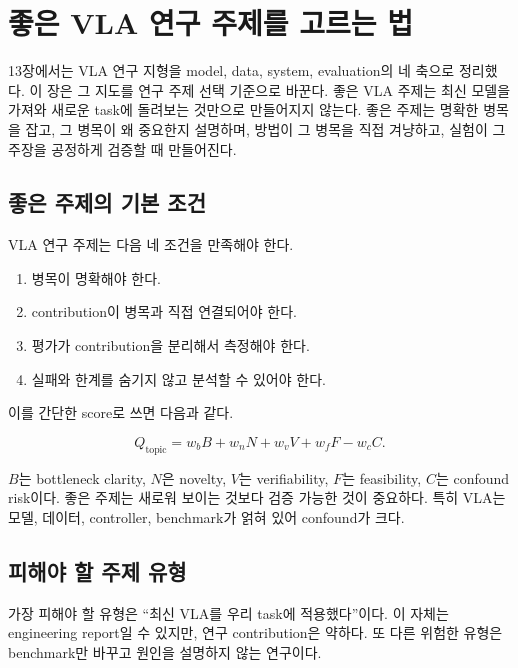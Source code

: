 \chapter{좋은 VLA 연구 주제를 고르는 법}
\label{ch:research_topic_selection}

13장에서는 VLA 연구 지형을 model, data, system, evaluation의 네 축으로 정리했다. 이 장은 그 지도를 연구 주제 선택 기준으로 바꾼다. 좋은 VLA 주제는 최신 모델을 가져와 새로운 task에 돌려보는 것만으로 만들어지지 않는다. 좋은 주제는 명확한 병목을 잡고, 그 병목이 왜 중요한지 설명하며, 방법이 그 병목을 직접 겨냥하고, 실험이 그 주장을 공정하게 검증할 때 만들어진다.

\section{좋은 주제의 기본 조건}

VLA 연구 주제는 다음 네 조건을 만족해야 한다.

\begin{enumerate}
  \item 병목이 명확해야 한다.
  \item contribution이 병목과 직접 연결되어야 한다.
  \item 평가가 contribution을 분리해서 측정해야 한다.
  \item 실패와 한계를 숨기지 않고 분석할 수 있어야 한다.
\end{enumerate}

이를 간단한 score로 쓰면 다음과 같다.

\begin{equation}
  Q_{\mathrm{topic}}
  =
  w_b B
  +
  w_n N
  +
  w_v V
  +
  w_f F
  -
  w_c C.
\end{equation}

$B$는 bottleneck clarity, $N$은 novelty, $V$는 verifiability, $F$는 feasibility, $C$는 confound risk이다. 좋은 주제는 새로워 보이는 것보다 검증 가능한 것이 중요하다. 특히 VLA는 모델, 데이터, controller, benchmark가 얽혀 있어 confound가 크다.

\section{피해야 할 주제 유형}

가장 피해야 할 유형은 ``최신 VLA를 우리 task에 적용했다''이다. 이 자체는 engineering report일 수 있지만, 연구 contribution은 약하다. 또 다른 위험한 유형은 benchmark만 바꾸고 원인을 설명하지 않는 연구이다.

